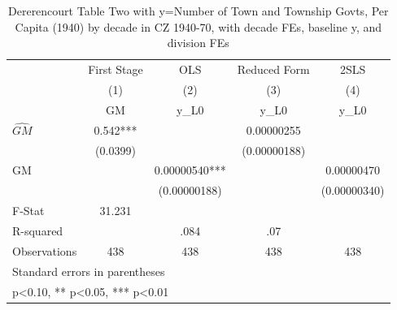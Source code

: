 \begin{table}[htbp]\centering
\def\sym#1{\ifmmode^{#1}\else\(^{#1}\)\fi}
\caption{Dererencourt Table Two with y=Number of Town and Township Govts, Per Capita (1940) by decade in CZ 1940-70, with decade FEs, baseline y, and division FEs}
\begin{tabular}{l*{4}{c}}
\toprule
                    & First Stage   &         OLS   &Reduced Form   &        2SLS   \\
                    &\multicolumn{1}{c}{(1)}&\multicolumn{1}{c}{(2)}&\multicolumn{1}{c}{(3)}&\multicolumn{1}{c}{(4)}\\
                    &\multicolumn{1}{c}{GM}&\multicolumn{1}{c}{y\_L0}&\multicolumn{1}{c}{y\_L0}&\multicolumn{1}{c}{y\_L0}\\
\midrule
$\hat{GM}$          &       0.542***&               &  0.00000255   &               \\
                    &    (0.0399)   &               &(0.00000188)   &               \\
\addlinespace
GM                  &               &  0.00000540***&               &  0.00000470   \\
                    &               &(0.00000188)   &               &(0.00000340)   \\
\midrule
F-Stat              &      31.231   &               &               &               \\
R-squared           &               &        .084   &         .07   &               \\
Observations        &         438   &         438   &         438   &         438   \\
\bottomrule
\multicolumn{5}{l}{\footnotesize Standard errors in parentheses}\\
\multicolumn{5}{l}{\footnotesize * p<0.10, ** p<0.05, *** p<0.01}\\
\end{tabular}
\end{table}
